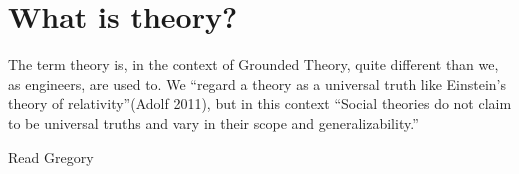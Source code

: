 \section{What is theory?}
The term theory is, in the context of Grounded Theory, quite different than we, as engineers, are used to. We “regard a theory as a universal truth like Einstein’s theory of relativity”(Adolf 2011), but in this context “Social theories do not claim to be universal truths and vary in their scope and generalizability.”


Read Gregory